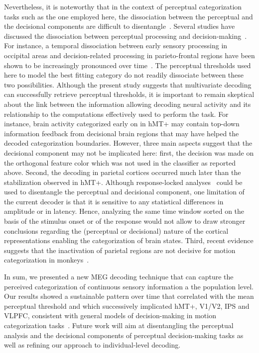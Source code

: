 Nevertheless, it is noteworthy that in the context of perceptual categorization tasks such as the one employed here, the dissociation between the perceptual and the decisional components are difficult to disentangle~\cite{mostert2015dissociating,kelly2013internal,heekeren2008neural}. Several studies have discussed the dissociation between perceptual processing and decision-making~\cite{philiastides2006temporal,philiastides2006neural,ratcliff2009quality,o2012supramodal,wyart2012rhythmic,de2013prestimulus,kelly2013internal,pitts2012visual,mostert2015dissociating}. For instance, a temporal dissociation between early sensory processing in occipital areas and decision-related processing in parieto-frontal regions have been shown to be increasingly pronounced over time~\cite{mostert2015dissociating}. The perceptual thresholds used here to model the best fitting category do not readily dissociate between these two possibilities. Although the present study suggests that multivariate decoding can successfully retrieve perceptual thresholds, it is important to remain skeptical about the link between the information allowing decoding neural activity and its relationship to the computations effectively used to perform the task. For instance, brain activity categorized early on in hMT+ may contain top-down information feedback from decisional brain regions that may have helped the decoded categorization boundaries. However, three main aspects suggest that the decisional component may not be implicated here: first, the decision was made on the orthogonal feature color which was not used in the classifier as reported above. Second, the decoding in parietal cortices occurred much later than the stabilization observed in hMT+. Although response-locked analyses~\cite{kelly2013internal} could be used to disentangle the perceptual and decisional component, one limitation of the current decoder is that it is sensitive to any statistical differences in amplitude or in latency. Hence, analyzing the same time window sorted on the basis of the stimulus onset or of the response would not allow to draw stronger conclusions regarding the (perceptual or decisional) nature of the cortical representations enabling the categorization of brain states. Third, recent evidence suggests that the inactivation of parietal regions are not decisive for motion categorization in monkeys~\cite{katz2016dissociated}. 

In sum, we presented a new MEG decoding technique that can capture the perceived categorization of continuous sensory information a the population level. Our results showed a sustainable pattern over time that correlated with the mean perceptual threshold and which successively implicated hMT+, V1/V2, IPS and VLPFC, consistent with general models of decision-making in motion categorization tasks~\cite{mazurek2003role}. Future work will aim at disentangling the perceptual analysis and the decisional components of perceptual decision-making tasks as well as refining our approach to individual-level decoding.
